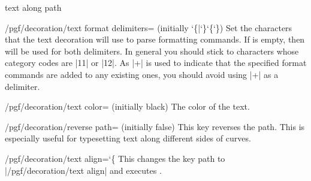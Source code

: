 \begin{decoration}{text along path}
{\begin{key}{/pgf/decoration/text format delimiters= (initially \char`\{|\char`\}\char`\{\char`\})}
        Set the characters that the text decoration will use to parse
        formatting commands. If  is empty, then  will
        be used for both delimiters. In general you should stick to characters
        whose category codes are |11| or |12|. As |+| is used to indicate that
        the specified format commands are added to any existing ones, you
        should avoid using |+| as a delimiter.
\begin{codeexample}[preamble={\usetikzlibrary{decorations.text}}]
\end{codeexample}
    \end{key}
}

    \begin{key}{/pgf/decoration/text color= (initially black)}
        The color of the text.
    \end{key}

    \begin{key}{/pgf/decoration/reverse path= (initially false)}
        This key reverses the path. This is especially useful for typesetting
        text along different sides of curves.
\begin{codeexample}[preamble={\usetikzlibrary{decorations.text}}]
\end{codeexample}
    \end{key}

    \begin{key}{/pgf/decoration/text align={\ttfamily\char`\{}}
        This changes the key path to |/pgf/decoration/text align| and executes
        .
    \end{key}


\end{decoration}
